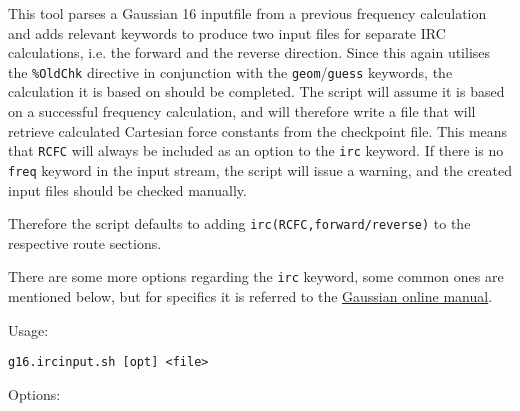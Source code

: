 \documentclass[   %
  final,          %
  a4paper         %
]{article}
\begin{document}
This tool parses a Gaussian 16 inputfile from a previous frequency calculation and 
adds relevant keywords to produce two input files for separate IRC calculations, 
i.e. the forward and the reverse direction.
Since this again utilises the \texttt{\%OldChk} directive in conjunction with 
the \texttt{geom}/\texttt{guess} keywords, the calculation it is based on should be completed.
The script will assume it is based on a successful frequency calculation, 
and will therefore write a file that will retrieve calculated Cartesian force constants from the checkpoint file.
This means that \texttt{RCFC} will always be included as an option to the \texttt{irc} keyword.
If there is no \texttt{freq} keyword in the input stream, the script will issue a warning,
and the created input files should be checked manually.

Therefore the script defaults to adding \texttt{irc(RCFC,forward/reverse)} to the respective route sections.

There are some more options regarding the \texttt{irc} keyword, some common ones are mentioned below,
but for specifics it is referred to the \href{http://gaussian.com/irc/}{Gaussian online manual}.

Usage: 

\lstinline`g16.ircinput.sh [opt] <file>`

Options:
\end{document}
